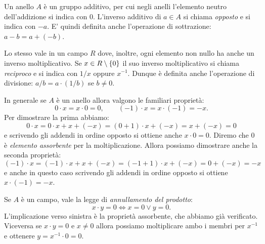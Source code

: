 Un anello $A$ è un gruppo additivo, per cui negli anelli l'elemento neutro 
dell'addizione si indica con $0$. 
L'inverso additivo di $a\in A$ si chiama \emph{opposto} e si indica con $-a$.
E' quindi definita anche l'operazione di sottrazione: $a-b = a+(-b)$.

Lo stesso vale in un campo $R$ dove, inoltre, ogni elemento non nullo ha 
anche un inverso moltiplicativo. Se $x\in R\setminus{\left\{ 0 \right\}}$ il suo
inverso moltiplicativo si chiama \emph{reciproco} e si indica con $1/x$ oppure $x^{-1}$.
Dunque è definita anche l'operazione di divisione: $a/b = a\cdot (1/b)$
se $b\neq 0$.

In generale se $A$ è un anello allora valgono
le familiari proprietà:
\[
  0\cdot x = x\cdot 0 = 0, \qquad
  (-1)\cdot x = x \cdot (-1) = -x.
\]
Per dimostrare la prima abbiamo: 
\[
  0\cdot x = 0\cdot x + x + (-x) = (0+1)\cdot x + (-x) = x + (-x) = 0
\]
e scrivendo gli addendi in ordine opposto si ottiene anche $x\cdot 0 = 0$.
Diremo che $0$ è \emph{elemento assorbente}
%
%  
%
per la moltiplicazione.
Allora possiamo dimostrare anche la seconda proprietà:
\[
   (-1)\cdot x = (-1)\cdot x + x + (-x) = (-1 + 1)\cdot x + (-x) = 0 + (-x) = -x
\]
e anche in questo caso scrivendo gli addendi in ordine opposto si ottiene $x\cdot(-1)=-x$.

Se $A$ è un campo, vale la legge di \emph{annullamento del prodotto}:
%
%
\[
  x\cdot y = 0 \iff x=0 \lor y=0.
\]
L'implicazione verso sinistra è la proprietà assorbente, che abbiamo già 
verificato. 
Viceversa se $x\cdot y = 0$ e $x\neq 0$ allora possiamo moltiplicare
ambo i membri per $x^{-1}$ e ottenere $y=x^{-1}\cdot 0 = 0$.

